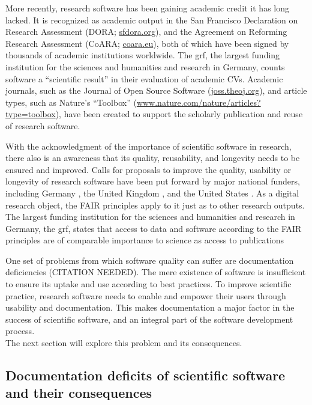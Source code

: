 More recently, research software has been gaining academic credit it has long lacked.
It is recognized as academic output in the San Francisco Declaration on Research Assessment (DORA; \href{https://sfdora.org/}{sfdora.org}), and the Agreement on Reforming Research Assessment (CoARA; \href{https://coara.eu}{coara.eu}), both of which have been signed by thousands of academic institutions worldwide. The \gls{grf}, the largest funding institution for the sciences and humanities and research in Germany, counts software a ``scientific result'' in their evaluation of academic CVs.
Academic journals, such as the Journal of Open Source Software (\href{https://joss.theoj.org/}{joss.theoj.org}), and article types, such as Nature's ``Toolbox'' (\href{https://www.nature.com/nature/articles?type=toolbox}{www.nature.com/nature/articles?type=toolbox}), have been created to support the scholarly publication and reuse of research software.

With the acknowledgment of the importance of scientific software in research, there also is an awareness that its quality, reusability, and longevity needs to be ensured and improved.
Calls for proposals to improve the quality, usability or longevity of research software have been put forward by major national funders, including Germany \citep{dfgrs}, the United Kingdom \citep{ukri}, and the United States \citep{nih}.
As a digital research object, the \gls{FAIR} principles apply to it just as to other research outputs.
The largest funding institution for the sciences and humanities and research in Germany, the \gls{grf}, states that access to data and software according to the FAIR principles are of comparable importance to science as access to publications \citep{dfg}

One set of problems from which software quality can suffer are documentation deficiencies (CITATION NEEDED).
The mere existence of software is insufficient to ensure its uptake and use according to best practices.
To improve scientific practice, research software needs to enable and empower their users through usability and documentation.
This makes documentation a major factor in the success of scientific software, and an integral part of the software development process.\\
The next section will explore this problem and its consequences.


\subsection{Documentation deficits of scientific software and their consequences}


